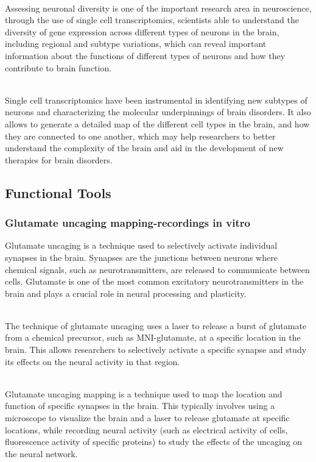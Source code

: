 \begin{itemize}
\begin{itemize}
\\Assessing neuronal diversity is one of the important research area in neuroscience, through the use of single cell transcriptomics, scientists able to understand the diversity of gene expression across different types of neurons in the brain, including regional and subtype variations, which can reveal important information about the functions of different types of neurons and how they contribute to brain function.

\\Single cell transcriptomics have been instrumental in identifying new subtypes of neurons and characterizing the molecular underpinnings of brain disorders. It also allows to generate a detailed map of the different cell types in the brain, and how they are connected to one another, which may help researchers to better understand the complexity of the brain and aid in the development of new therapies for brain disorders.

\subsection{Functional Tools}
\subsubsection{Glutamate uncaging mapping-recordings in vitro}
Glutamate uncaging is a technique used to selectively activate individual synapses in the brain. Synapses are the junctions between neurons where chemical signals, such as neurotransmitters, are released to communicate between cells. Glutamate is one of the most common excitatory neurotransmitters in the brain and plays a crucial role in neural processing and plasticity.

\\The technique of glutamate uncaging uses a laser to release a burst of glutamate from a chemical precursor, such as MNI-glutamate, at a specific location in the brain. This allows researchers to selectively activate a specific synapse and study its effects on the neural activity in that region.

\\Glutamate uncaging mapping is a technique used to map the location and function of specific synapses in the brain. This typically involves using a microscope to visualize the brain and a laser to release glutamate at specific locations, while recording neural activity (such as electrical activity of cells, fluorescence activity of specific proteins) to study the effects of the uncaging on the neural network.


\end{itemize}
\end{itemize}
